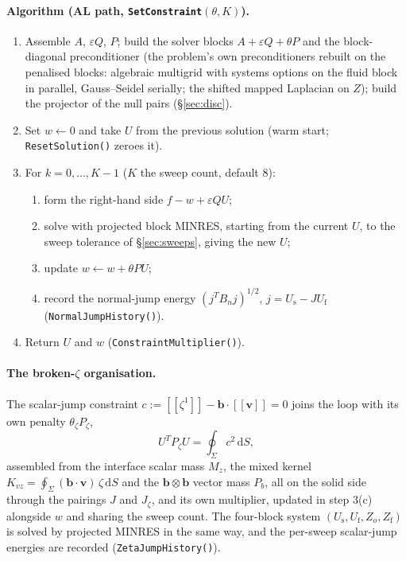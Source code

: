 \documentclass[11pt]{article}
\newcommand{\eps}{\varepsilon}
\newcommand{\bv}{\mathbf{v}}
\newcommand{\jump}[1]{[\![#1]\!]}
\newcommand{\dS}{\,\mathrm{d}S}
\begin{document}
\paragraph{Algorithm (AL path, \texttt{SetConstraint}$(\theta, K)$).}
\begin{enumerate}
\item Assemble $A$, $\eps Q$, $P$; build the solver blocks
  $A + \eps Q + \theta P$ and the block-diagonal preconditioner (the
  problem's own preconditioners rebuilt on the penalised blocks:
  algebraic multigrid with systems options on the fluid block in
  parallel, Gauss--Seidel serially; the shifted mapped Laplacian on
  $Z$); build the projector of the null pairs (\S\ref{sec:disc}).
\item Set $w\leftarrow0$ and take $U$ from the previous solution (warm
  start; \texttt{ResetSolution()} zeroes it).
\item For $k = 0,\dots,K-1$ ($K$ the sweep count, default 8):
  \begin{enumerate}
  \item form the right-hand side $f - w + \eps QU$;
  \item solve with projected block MINRES, starting from the current
    $U$, to the sweep tolerance of \S\ref{sec:sweeps}, giving the new
    $U$;
  \item update $w\leftarrow w + \theta PU$;
  \item record the normal-jump energy $(j^{T}B_nj)^{1/2}$,
    $j = U_{\mathrm{s}} - JU_{\mathrm{f}}$ (\texttt{NormalJumpHistory()}).
  \end{enumerate}
\item Return $U$ and $w$ (\texttt{ConstraintMultiplier()}).
\end{enumerate}

\paragraph{The broken-$\zeta$ organisation.} The scalar-jump constraint
$c := \jump{\zeta^1} - \mathbf{b}\cdot\jump{\bv} = 0$ joins the loop
with its own penalty $\theta_\zeta P_\zeta$,
\[
  U^{T}P_\zeta U = \oint_\Sigma c^2 \dS ,
\]
assembled from the interface scalar mass $M_z$, the mixed kernel
$K_{vz} = \oint_\Sigma(\mathbf{b}\cdot\bv)\,\zeta\dS$ and the
$\mathbf{b}\otimes\mathbf{b}$ vector mass $P_b$, all on the solid side
through the pairings $J$ and $J_\zeta$, and its own multiplier, updated
in step 3(c) alongside $w$ and sharing the sweep count. The four-block
system $(U_{\mathrm{s}}, U_{\mathrm{f}}, Z_o, Z_{\mathrm{f}})$ is solved
by projected MINRES in the same way, and the per-sweep scalar-jump
energies are recorded (\texttt{ZetaJumpHistory()}).
\end{document}
